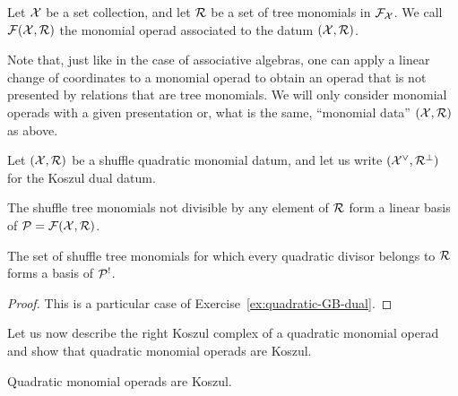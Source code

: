 \begin{definition}
Let $\mathcal{X}$ be a set collection, and let $\mathcal{R}$ be a set of tree monomials
in $\mathcal{F}_{\mathcal{X}}$. We call $\mathcal{F}(\mathcal{X},\mathcal{R})$ the monomial operad associated to the
datum $(\mathcal{X},\mathcal{R})$. 
\end{definition}

Note that, just like in the case of associative algebras, one can apply
a linear change of coordinates to a monomial operad to obtain an operad
that is not presented by relations that are tree monomials. We will only
consider monomial operads with a given presentation or, what is the same,
``monomial data'' $(\mathcal{X},\mathcal{R})$ as above.

\begin{lemma}
Let $(\mathcal{X},\mathcal{R})$ be a shuffle quadratic monomial datum, and let us write
$(\mathcal{X}^\vee,\mathcal{R}^\perp)$ for the Koszul dual datum. 
\begin{tenumerate}
\item The shuffle tree monomials
not divisible by any element of $\mathcal{R}$ form a linear basis of
${\mathcal{P}} = \mathcal{F}(\mathcal{X},\mathcal{R})$.
\item  The set of shuffle tree monomials for which every
quadratic divisor belongs to $\mathcal{R}$ forms a basis of ${\mathcal{P}}^!$.
\end{tenumerate} 
\end{lemma}

\begin{proof}
This is a particular case of Exercise~\ref{ex:quadratic-GB-dual}.
\end{proof}

Let us now describe the right Koszul complex of a quadratic monomial operad
and show that quadratic monomial operads are Koszul.

\begin{theorem}
Quadratic monomial operads are Koszul.
\end{theorem}

